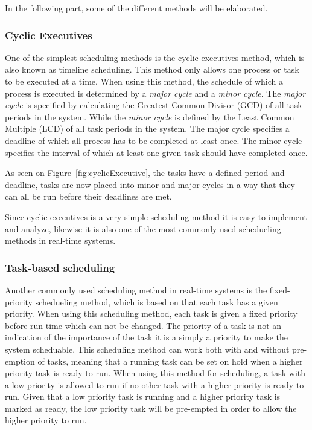 In the following part, some of the different methods will be elaborated. 

\subsubsection{Cyclic Executives}
One of the simplest scheduling methods is the cyclic executives method, which is also known as timeline scheduling.
This method only allows one process or task to be executed at a time. 
When using this method, the schedule of which a process is executed is determined by a \textit{major cycle} and a \textit{minor cycle}.
The \textit{major cycle} is specified by calculating the Greatest Common Divisor (GCD) of all task periods in the system.
While the \textit{minor cycle} is defined by the Least Common Multiple (LCD) of all task periods in the system. 
The major cycle specifies a deadline of which all process has to be completed at least once.
The minor cycle specifies the interval of which at least one given task should have completed once. 


As seen on Figure~\ref{fig:cyclicExecutive}, the tasks have a defined period and deadline, tasks are now placed into minor and major cycles in a way that they can all be run before their deadlines are met. 


Since cyclic executives is a very simple scheduling method it is easy to implement and analyze, likewise it is also one of the most commonly used schedueling methods in real-time systems\cite{RealTimeEmbeddedSystems}. 

\subsubsection{Task-based scheduling}
Another commonly used scheduling method in real-time systems is the fixed-priority schedueling method, which is based on that each task has a given priority.
When using this scheduling method, each task is given a fixed priority before run-time which can not be changed.
The priority of a task is not an indication of the importance of the task it is a simply a priority to make the system scheduable\cite{RealTimeEmbeddedSystems}. 
This scheduling method can work both with and without pre-emption of tasks, meaning that a running task can be set on hold when a higher priority task is ready to run.
When using this method for scheduling, a task with a low priority is allowed to run if no other task with a higher priority is ready to run. 
Given that a low priority task is running and a higher priority task is marked as ready, the low priority task will be pre-empted in order to allow the higher priority to run.


